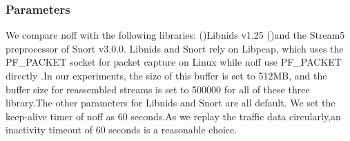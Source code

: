 \documentclass[conference]{IEEEtran}
\begin{document}
\subsubsection{Parameters}
We compare noff with the following libraries: (\uppercase\expandafter{})Libnids v1.25\cite{Libnids}
(\uppercase\expandafter{})and the Stream5 preprocessor of Snort v3.0.0. Libnids and Snort rely on Libpcap\cite{McCanne}, which uses the PF\_PACKET socket for packet capture on Linux while noff use PF\_PACKET directly .In our experiments, the size of this buffer is set to 512MB, and the buffer size for reassembled streams is set to 500000 for all of these three library.The other parameters for Libnids and Snort are all default.  
We set the keep-alive timer of noff as 60 seconds.As we replay the traffic data circularly,an inactivity timeout of 60 seconds is a reasonable choice.
\end{document}
